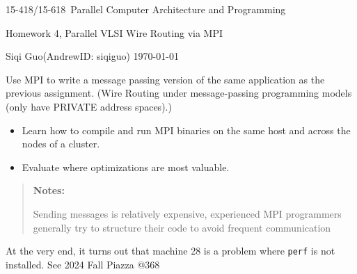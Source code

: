 \documentclass[letterpaper,11pt]{exam}
\newcommand{\num}{4}
\newcommand{\topic}{Homework \num, Parallel VLSI Wire Routing via MPI}
\newcommand{\coursenum}{15-418/15-618}
\newcommand{\coursename}{\coursenum\ Parallel Computer Architecture and Programming}
\newcommand{\fullname}{Siqi Guo}
\newcommand{\andrew}{AndrewID: siqiguo}
\begin{document}
\begin{center}
    {\LARGE\coursename\par}
    {\Large\topic\par}
    \fullname (\andrew) \hfill \today
\end{center}
\printanswers

\vspace{-0.2cm}
Use MPI to write a message passing version of the same application as the previous assignment. (Wire Routing under message-passing programming models (only have PRIVATE address spaces).)
\vspace{-0.6cm}

\begin{itemize}[itemsep=0.1pt]
    \item Learn how to compile and run MPI binaries on the same host and across the nodes of a cluster.
    \item Evaluate where optimizations are most valuable.
\end{itemize}

\vspace{-0.8cm}
\begin{quote}
    \textbf{Notes:}

    Sending messages is relatively expensive, experienced MPI programmers generally try to structure their code to avoid frequent communication
\end{quote}

\vspace{-0.5cm}
At the very end, it turns out that machine 28 is a problem where \texttt{perf} is not installed. See 2024 Fall Piazza @368
\end{document}
